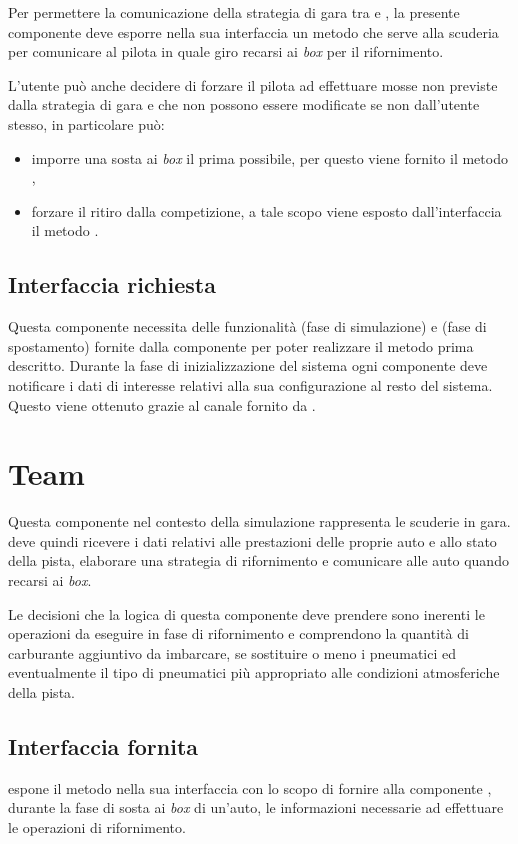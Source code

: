 Per permettere la comunicazione della strategia di gara tra \team{} e \car{}, la presente componente deve esporre nella sua interfaccia un metodo  che serve alla scuderia per comunicare al pilota in quale giro recarsi ai \textit{box} per il rifornimento.

L'utente può anche decidere di forzare il pilota ad effettuare mosse non previste dalla strategia di gara e che non possono essere modificate se non dall'utente stesso, in particolare può:
\begin{itemize}
\item imporre una sosta ai \textit{box} il prima possibile, per questo viene fornito il metodo ,
\item forzare il ritiro dalla competizione, a tale scopo viene esposto dall'interfaccia il metodo .
\end{itemize}

\subsection*{Interfaccia richiesta}
Questa componente necessita delle funzionalità  (fase di simulazione) e  (fase di spostamento) fornite dalla componente \track{} per poter realizzare il metodo  prima descritto.
Durante la fase di inizializzazione del sistema ogni componente \car{} deve notificare i dati di interesse relativi alla sua configurazione al resto del sistema. Questo viene ottenuto grazie al canale  fornito da \evdisp{}.

\section{Team}
Questa componente nel contesto della simulazione rappresenta le scuderie in gara. \team{} deve quindi ricevere i dati relativi alle prestazioni delle proprie auto e allo stato della pista, elaborare una strategia di rifornimento e comunicare alle auto quando recarsi ai \textit{box}.

Le decisioni che la logica di questa componente deve prendere sono inerenti le operazioni da eseguire in fase di rifornimento e comprendono la quantità di carburante aggiuntivo da imbarcare, se sostituire o meno i pneumatici ed eventualmente il tipo di pneumatici più appropriato alle condizioni atmosferiche della pista.

\subsection*{Interfaccia fornita}
\team{} espone il metodo  nella sua interfaccia con lo scopo di fornire alla componente \track{}, durante la fase di sosta ai \textit{box} di un'auto, le informazioni necessarie ad effettuare le operazioni di rifornimento.


